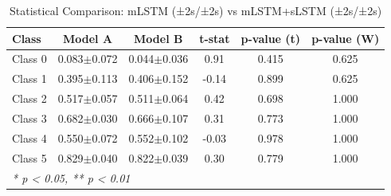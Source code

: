 \begin{table}[htbp]
\centering
\caption{Statistical Comparison: mLSTM (±2s/±2s) vs mLSTM+sLSTM (±2s/±2s)}
\label{tab:comparison_class_mlstm_±2s_±2s_vs_mlstmslstm_±2s_±2s}
\begin{tabular}{lccccc}
\toprule
\textbf{Class} & \textbf{Model A} & \textbf{Model B} & \textbf{t-stat} & \textbf{p-value (t)} & \textbf{p-value (W)} \\
\midrule
Class 0 & 0.083$\pm$0.072 & 0.044$\pm$0.036 & 0.91 & 0.415 & 0.625 \\
Class 1 & 0.395$\pm$0.113 & 0.406$\pm$0.152 & -0.14 & 0.899 & 0.625 \\
Class 2 & 0.517$\pm$0.057 & 0.511$\pm$0.064 & 0.42 & 0.698 & 1.000 \\
Class 3 & 0.682$\pm$0.030 & 0.666$\pm$0.107 & 0.31 & 0.773 & 1.000 \\
Class 4 & 0.550$\pm$0.072 & 0.552$\pm$0.102 & -0.03 & 0.978 & 1.000 \\
Class 5 & 0.829$\pm$0.040 & 0.822$\pm$0.039 & 0.30 & 0.779 & 1.000 \\
\bottomrule
\multicolumn{6}{l}{\textit{* p < 0.05, ** p < 0.01}} \\
\end{tabular}
\end{table}